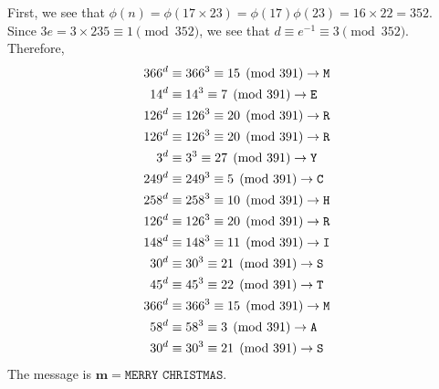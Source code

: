 \documentclass[11pt]{article}
\renewcommand{\vec}[1]{\mathbf{#1}}
\begin{document}
\newpage{}
First, we see that $\phi(n) = \phi(17\times 23) = \phi(17)\phi(23) = 16\times 22 = 352$.\\
Since $3e = 3\times 235\equiv 1\pmod{352}$,
we see that $d \equiv e^{-1}\equiv 3\pmod{352}$.\\
Therefore,
\begin{align*}
  366^d &\equiv 366^3 \equiv 15 \pmod{391} \to {\tt M}\\
   14^d &\equiv  14^3 \equiv  7 \pmod{391} \to {\tt E}\\
  126^d &\equiv 126^3 \equiv 20 \pmod{391} \to {\tt R}\\
  126^d &\equiv 126^3 \equiv 20 \pmod{391} \to {\tt R}\\
    3^d &\equiv   3^3 \equiv 27 \pmod{391} \to {\tt Y}\\
  249^d &\equiv 249^3 \equiv  5 \pmod{391} \to {\tt C}\\
  258^d &\equiv 258^3 \equiv 10 \pmod{391} \to {\tt H}\\
  126^d &\equiv 126^3 \equiv 20 \pmod{391} \to {\tt R}\\
  148^d &\equiv 148^3 \equiv 11 \pmod{391} \to {\tt I}\\
   30^d &\equiv  30^3 \equiv 21 \pmod{391} \to {\tt S}\\
   45^d &\equiv  45^3 \equiv 22 \pmod{391} \to {\tt T}\\
  366^d &\equiv 366^3 \equiv 15 \pmod{391} \to {\tt M}\\
   58^d &\equiv  58^3 \equiv  3 \pmod{391} \to {\tt A}\\
   30^d &\equiv  30^3 \equiv 21 \pmod{391} \to {\tt S}\\
\end{align*}
The message is $\vec{m} = \texttt{MERRY CHRISTMAS}$.
\end{document}
